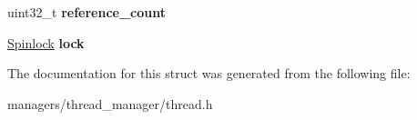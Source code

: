 \begin{DoxyCompactItemize}
\item 
uint32\+\_\+t {\bfseries reference\+\_\+count}\hypertarget{structThreadInfo_a0930c7541ed3674cd802815308089ec4}{}\label{structThreadInfo_a0930c7541ed3674cd802815308089ec4}

\item 
\hyperlink{group__sync__hal_ga2b7bd1f01b65ccbfaee98f004746ae8b}{Spinlock} {\bfseries lock}\hypertarget{structThreadInfo_ad0bb5157e50b78b0cfac80bfa2fb1537}{}\label{structThreadInfo_ad0bb5157e50b78b0cfac80bfa2fb1537}

\end{DoxyCompactItemize}


The documentation for this struct was generated from the following file\+:\begin{DoxyCompactItemize}
\item 
managers/thread\+\_\+manager/thread.\+h\end{DoxyCompactItemize}
